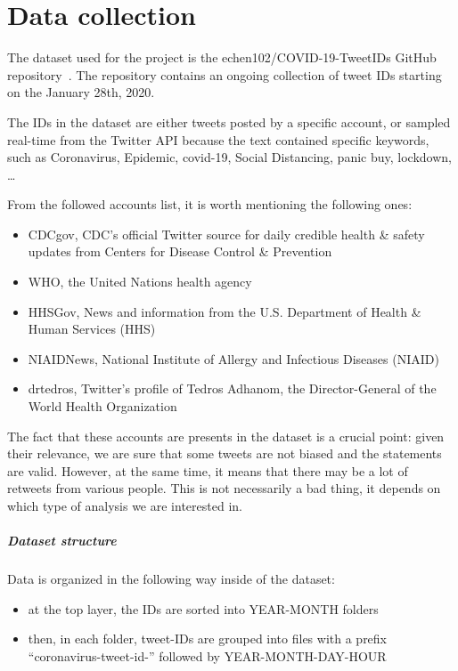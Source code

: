 \graphicspath{{chapters/chapter2/img/}}

\chapter{Data collection}
\label{cha:data}
The dataset used for the project is the echen102/COVID-19-TweetIDs GitHub repository~\cite{chen2020tracking}. The repository contains an ongoing collection of tweet IDs starting on the January 28th, 2020.

The IDs in the dataset are either tweets posted by a specific account, or sampled real-time from the Twitter API because the text contained specific keywords, such as Coronavirus, Epidemic, covid-19, Social Distancing, panic buy, lockdown, \ldots 

From the followed accounts list, it is worth mentioning the following ones:
\begin{itemize}
	\item CDCgov, CDC's official Twitter source for daily credible health \& safety updates from Centers for Disease Control \& Prevention
	\item WHO, the United Nations health agency
	\item HHSGov, News and information from the U.S. Department of Health \& Human Services (HHS)
	\item NIAIDNews, National Institute of Allergy and Infectious Diseases (NIAID)
	\item drtedros, Twitter's profile of Tedros Adhanom, the Director-General of the World Health Organization
\end{itemize}

The fact that these accounts are presents in the dataset is a crucial point: given their relevance, we are sure that some tweets are not biased and the statements are valid. However, at the same time, it means that there may be a lot of retweets from various people. This is not necessarily a bad thing, it depends on which type of analysis we are interested in.

\paragraph{Dataset structure}

Data is organized in the following way inside of the dataset:

\begin{itemize}
	\item at the top layer, the IDs are sorted into YEAR-MONTH folders
	\item then, in each folder, tweet-IDs are grouped into files with a prefix “coronavirus-tweet-id-” followed by YEAR-MONTH-DAY-HOUR
\end{itemize}


